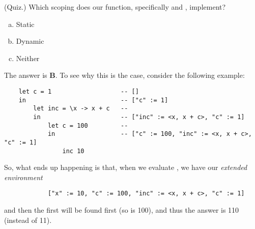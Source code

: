 \documentclass[letterpaper]{article}
\begin{document}
\begin{mdframed}[]
    (Quiz.) Which scoping does our  function, specifically  and , implement?
    \begin{enumerate}[(a)]
        \item Static 
        \item Dynamic 
        \item Neither 
    \end{enumerate} 

    \begin{mdframed}[]
        The answer is \textbf{B}. To see why this is the case, consider the following example:
        \begin{verbatim}
    let c = 1                   -- []
    in                          -- ["c" := 1]
        let inc = \x -> x + c   -- 
        in                      -- ["inc" := <x, x + c>, "c" := 1]
            let c = 100         --
            in                  -- ["c" := 100, "inc" := <x, x + c>, "c" := 1]
                inc 10 \end{verbatim}
        So, what ends up happening is that, when we evaluate , we have our \emph{extended environment}
        \begin{verbatim}
            ["x" := 10, "c" := 100, "inc" := <x, x + c>, "c" := 1]\end{verbatim}
        and then the first  will be found first (so  is 100), and thus the answer is 110 (instead of 11).
    \end{mdframed}
\end{mdframed}
\end{document}
